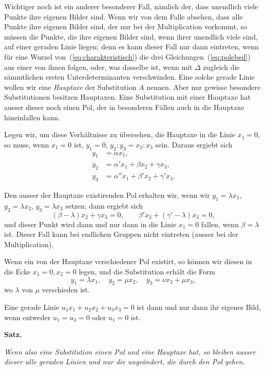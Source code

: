 \documentclass[12pt,a4paper]{article}
\begin{document}
Wichtiger noch ist ein anderer besonderer Fall, n\"amlich der, dass unendlich viele Punkte ihre eigenen Bilder sind. Wenn wir von dem Falle absehen, dass alle Punkte ihre eigenen Bilder sind, der nur bei der Multiplication vorkommt, so m\"ussen die Punkte, die ihre eigenen Bilder sind, wenn ihrer unendlich viele sind, auf einer geraden Linie liegen; denn es kann dieser Fall nur dann eintreten, wenn f\"ur eine Wurzel von~(\ref{eq:charakteristisch}) die drei Gleichungen~(\ref{eq:polebed}) aus einer von ihnen folgen, oder, was dasselbe ist, wenn mit $\Delta$ zugleich die s\"ammtlichen ersten Unterdeterminanten verschwinden. Eine solche gerade Linie wollen wir eine \textit{Hauptaxe} der Substitution $A$ nennen. Aber nur gewisse besondere Substitutionen besitzen Hauptaxen. Eine Substitution mit einer Hauptaxe hat ausser dieser noch einen Pol, der in besonderen F\"allen auch in die Hauptaxe hineinfallen kann.

Legen wir, um diese Verh\"altnisse zu \"ubersehen, die Hauptaxe in die Linie $x_1 = 0$, so muss, wenn $x_1 = 0$ ist, $y_1 = 0$, $y_2 : y_3 = x_2 : x_3$ sein. Daraus ergiebt sich
\begin{align*}
y_1 &= \alpha x_1,\\
y_2 &= \alpha' x_1 + \beta x_2 + \gamma x_3,\\
y_3 &= \alpha'' x_1 + \beta' x_2 + \gamma' x_3.
\end{align*}

Den ausser der Hauptaxe existirenden Pol erhalten wir, wenn wir $y_1 = \lambda x_1$, $y_2 = \lambda x_2$, $y_3 = \lambda x_3$ setzen; dann ergiebt sich
\[(\beta - \lambda)x_2 + \gamma x_3 = 0, \qquad \beta' x_2 + (\gamma' - \lambda)x_3 = 0,\]
und dieser Punkt wird dann und nur dann in die Linie $x_1 = 0$ fallen, wenn $\beta = \lambda$ ist. Dieser Fall kann bei endlichen Gruppen nicht eintreten (ausser bei der Multiplication).

Wenn ein von der Hauptaxe verschiedener Pol existirt, so k\"onnen wir diesen in die Ecke $x_1 = 0, x_2 = 0$ legen, und die Substitution erh\"alt die Form
\[y_1 = \lambda x_1, \quad y_2 = \mu x_2, \quad y_3 = \nu x_2 + \mu x_3,\]
wo $\lambda$ von $\mu$ verschieden ist.

Eine gerade Linie $u_1 x_1 + u_2 x_2 + u_3 x_3 = 0$ ist dann und nur dann ihr eigenes Bild, wenn entweder $u_1 = u_3 = 0$ oder $u_1 = 0$ ist.

\begin{center}\textbf{Satz.}\end{center}
\textit{Wenn also eine Substitution einen Pol und eine Hauptaxe hat, so bleiben ausser dieser alle geraden Linien und nur die unge\"andert, die durch den Pol gehen.}
\end{document}
